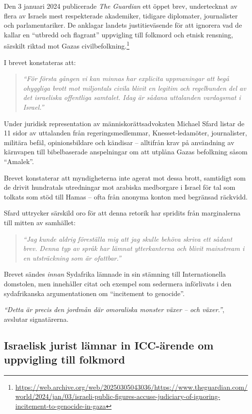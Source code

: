 Den 3 januari 2024 publicerade \textit{The Guardian} ett öppet brev, undertecknat av flera av Israels mest respekterade akademiker, tidigare diplomater, journalister och parlamentariker. De anklagar landets justitieväsende för att ignorera vad de kallar en “utbredd och flagrant” uppvigling till folkmord och etnisk rensning, särskilt riktad mot Gazas civilbefolkning.\footnote{\url{https://web.archive.org/web/20250305043036/https://www.theguardian.com/world/2024/jan/03/israeli-public-figures-accuse-judiciary-of-ignoring-incitement-to-genocide-in-gaza}}

I brevet konstateras att:
\begin{quote}
\textit{“För första gången vi kan minnas har explicita uppmaningar att begå ohyggliga brott mot miljontals civila blivit en legitim och regelbunden del av det israeliska offentliga samtalet. Idag är sådana uttalanden vardagsmat i Israel.”}
\end{quote}

Under juridisk representation av människorättsadvokaten Michael Sfard listar de 11 sidor av uttalanden från regeringsmedlemmar, Knesset-ledamöter, journalister, militära befäl, opinionsbildare och kändisar – alltifrån krav på användning av kärnvapen till bibelbaserade anspelningar om att utplåna Gazas befolkning såsom “Amalek”.

Brevet konstaterar att myndigheterna inte agerat mot dessa brott, samtidigt som de drivit hundratals utredningar mot arabiska medborgare i Israel för tal som tolkats som stöd till Hamas – ofta från anonyma konton med begränsad räckvidd.

Sfard uttrycker särskild oro för att denna retorik har spridits från marginalerna till mitten av samhället:
\begin{quote}
\textit{“Jag kunde aldrig föreställa mig att jag skulle behöva skriva ett sådant brev. Denna typ av språk har lämnat ytterkanterna och blivit mainstream i en utsträckning som är ofattbar.”}
\end{quote}

Brevet sändes \textit{innan} Sydafrika lämnade in sin stämning till Internationella domstolen, men innehåller citat och exempel som sedermera införlivats i den sydafrikanska argumentationen om “incitement to genocide”.

\textit{“Detta är precis den jordmån där omoraliska monster växer – och växer.”}, avslutar signatärerna.



\subsection{Israelisk jurist lämnar in ICC-ärende om uppvigling till folkmord}

